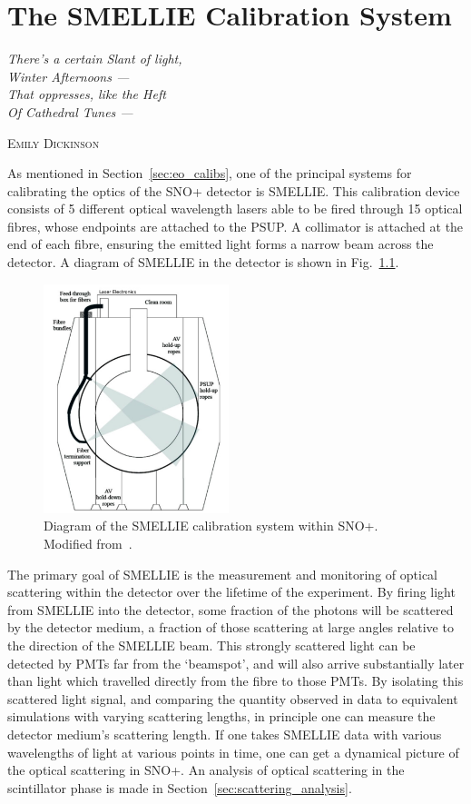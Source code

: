 \chapter{The SMELLIE Calibration System}\label{chap:smellie_hardware}
\epigraph{\textit{There's a certain Slant of light,\\
Winter Afternoons ---\\
That oppresses, like the Heft\\
Of Cathedral Tunes ---}}{\textsc{Emily Dickinson}}

As mentioned in Section~\ref{sec:eo_calibs}, one of the principal systems for calibrating the optics of the SNO+ detector is SMELLIE. This calibration device consists of 5 different optical wavelength lasers able to be fired through 15 optical fibres, whose endpoints are attached to the PSUP. A collimator is attached at the end of each fibre, ensuring the emitted light forms a narrow beam across the detector. A diagram of SMELLIE in the detector is shown in Fig.~\ref{fig:smellie_diagram}.

\begin{figure}
    \centering
    \includegraphics[width=0.48\textwidth]{3_SMELLIEHardware/images/SMELLIE_picture_corrected.png}
    \caption[Diagram of the SMELLIE calibration system within SNO+]
    {Diagram of the SMELLIE calibration system within SNO+. Modified from~\cite{sinclairPositioningTimingCalibration2015}.}
    \label{fig:smellie_diagram}
\end{figure}

The primary goal of SMELLIE is the measurement and monitoring of optical scattering within the detector over the lifetime of the experiment. By firing light from SMELLIE into the detector, some fraction of the photons will be scattered by the detector medium, a fraction of those scattering at large angles relative to the direction of the SMELLIE beam. This strongly scattered light can be detected by PMTs far from the `beamspot', and will also arrive substantially later than light which travelled directly from the fibre to those PMTs. By isolating this scattered light signal, and comparing the quantity observed in data to equivalent simulations with varying scattering lengths, in principle one can measure the detector medium's scattering length. If one takes SMELLIE data with various wavelengths of light at various points in time, one can get a dynamical picture of the optical scattering in SNO+. An analysis of optical scattering in the scintillator phase is made in Section~\ref{sec:scattering_analysis}.

